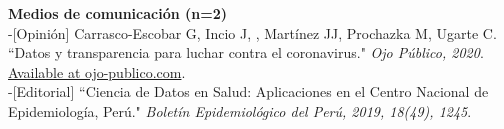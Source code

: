 \documentclass[margin,line]{res}
\newenvironment{list1}{
	\begin{list}{\ding{113}}{%
			\setlength{\itemsep}{0in}
			\setlength{\parsep}{0in} \setlength{\parskip}{0in}
			\setlength{\topsep}{0in} \setlength{\partopsep}{0in}
			\setlength{\leftmargin}{0.17in}}}{\end{list}}
\begin{document}
\begin{resume}
		{\bf Medios de comunicación (n=2)}\\
		-[Opinión] Carrasco-Escobar G, Incio J, \underline{}, Mart{\'i}nez JJ, Prochazka M, Ugarte C. ``Datos y transparencia para luchar contra el coronavirus." \textit{Ojo P{\'u}blico, 2020}. \href{https://ojo-publico.com/1718/datos-y-transparencia-para-luchar-contra-el-coronavirus}{Available at ojo-publico.com}.\\
		-[Editorial] \underline{} ``Ciencia de Datos en Salud: Aplicaciones en el Centro Nacional de Epidemiología, Perú." \textit{Boletín Epidemiológico del Perú, 2019, 18(49), 1245}.\\
				
		
		
		
		
		

\end{resume}
\end{document}

